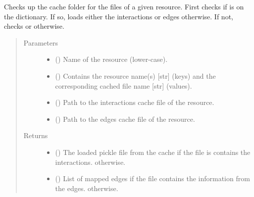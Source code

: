 \documentclass[letterpaper,10pt,english]{sphinxmanual}
\begin{document}
\begin{fulllineitems}
\begin{fulllineitems}
\end{fulllineitems}


\begin{fulllineitems}
\label{\detokenize{main:pypath.main.PyPath.lookup_cache}}
Checks up the cache folder for the files of a given resource.
First checks if  is on the  dictionary.
If so, loads either the interactions or edges otherwise. If
not, checks  or  otherwise.
\begin{quote}\begin{description}
\item[{Parameters}] \leavevmode\begin{itemize}
\item {} 
 () \textendash{} Name of the resource (lower-case).

\item {} 
 () \textendash{} Contains the resource name(s) {[}str{]} (keys) and the
corresponding cached file name {[}str{]} (values).

\item {} 
 () \textendash{} Path to the interactions cache file of the resource.

\item {} 
 () \textendash{} Path to the edges cache file of the resource.

\end{itemize}

\item[{Returns}] \leavevmode
\begin{itemize}
\item {} 
() \textendash{} The loaded pickle file from the cache if the
file is contains the interactions.  otherwise.

\item {} 
() \textendash{} List of mapped edges if the file contains the
information from the edges. \sphinxcode{\sphinxupquote{{[}{]}}} otherwise.


\end{itemize}
\end{description}
\end{quote}
\end{fulllineitems}
\end{fulllineitems}
\end{document}

